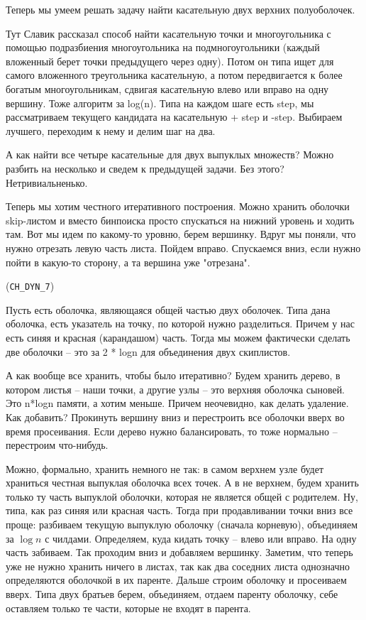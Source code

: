 \documentclass[11pt]{article}
\begin{document}
Теперь мы умеем решать задачу найти касательную двух верхних
полуоболочек.

Тут Славик рассказал способ найти касательную точки и многоугольника
с помощью подразбиения многоугольника на подмногоугольники (каждый
вложенный берет точки предыдущего через одну). Потом он типа ищет
для самого вложенного треугольника касательную, а потом
передвигается к более богатым многоугольникам, сдвигая касательную
влево или вправо на одну вершину. Тоже алгоритм за log(n). Типа на
каждом шаге есть step, мы рассматриваем текущего кандидата на
касательную + step и -step. Выбираем лучшего, переходим к нему и
делим шаг на два.

А как найти все четыре касательные для двух выпуклых множеств?
Можно разбить на несколько и сведем к предыдущей задачи. Без этого?
Нетривиальненько.



Теперь мы хотим честного итеративного построения. Можно хранить
оболочки skip-листом и вместо бинпоиска просто спускаться на нижний
уровень и ходить там. Вот мы идем по какому-то уровню, берем
вершинку. Вдруг мы поняли, что нужно отрезать левую часть
листа. Пойдем вправо. Спускаемся вниз, если нужно пойти в какую-то
сторону, а та вершина уже "отрезана".

(\verb~CH_DYN_7~)

Пусть есть оболочка, являющаяся общей частью двух оболочек. Типа
дана оболочка, есть указатель на точку, по которой нужно
разделиться. Причем у нас есть синяя и красная (карандашом) часть.
Тогда мы можем фактически сделать две оболочки -- это за 2 * logn
для объединения двух скиплистов.

А как вообще все хранить, чтобы было итеративно? Будем хранить
дерево, в котором листья -- наши точки, а другие узлы -- это верхняя
оболочка сыновей. Это n*logn памяти, а хотим меньше. Причем
неочевидно, как делать удаление. Как добавить? Прокинуть вершину
вниз и перестроить все оболочки вверх во время просеивания. Если
дерево нужно балансировать, то тоже нормально -- перестроим
что-нибудь.

Можно, формально, хранить немного не так: в самом верхнем узле будет
храниться честная выпуклая оболочка всех точек. А в не верхнем,
будем хранить только ту часть выпуклой оболочки, которая не является
общей с родителем. Ну, типа, как раз синяя или красная часть. Тогда
при продавливании точки вниз все проще: разбиваем текущую выпуклую
оболочку (сначала корневую), объединяем за $\log{n}$ с
чилдами. Определяем, куда кидать точку -- влево или вправо. На одну
часть забиваем. Так проходим вниз и добавляем вершинку. Заметим, что
теперь уже не нужно хранить ничего в листах, так как два соседних
листа однозначно определяются оболочкой в их паренте. Дальше строим
оболочку и просеиваем вверх. Типа двух братьев берем, объединяем,
отдаем паренту оболочку, себе оставляем только те части, которые не
входят в парента.
\end{document}
